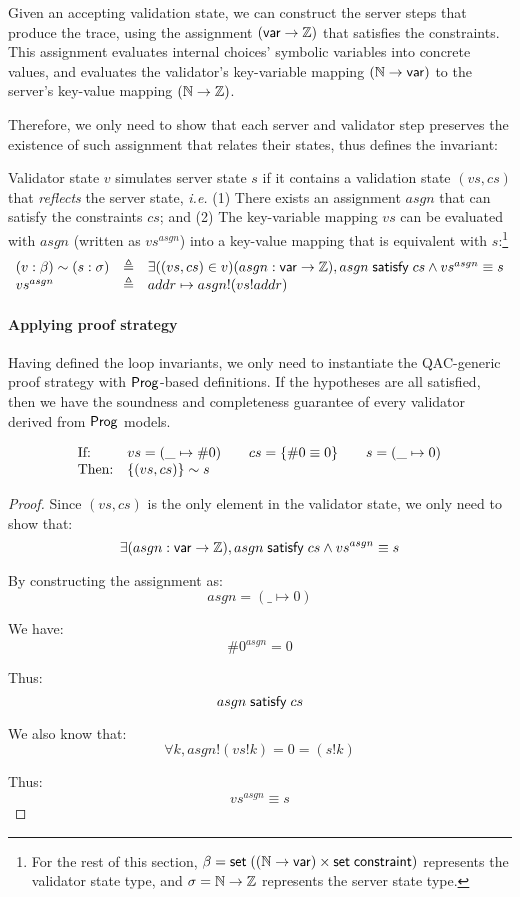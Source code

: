 Given an accepting validation state, we can construct the server steps that
produce the trace, using the assignment $(\mathsf{var}\to\mathbb Z)$ that satisfies the
constraints.  This assignment evaluates internal choices' symbolic variables
into concrete values, and evaluates the validator's key-variable mapping
$(\mathbb N\to\mathsf{var})$ to the server's key-value mapping $(\mathbb N\to\mathbb Z)$.

Therefore, we only need to show that each server and validator step preserves
the existence of such assignment that relates their states, thus defines the
invariant:

\begin{definition}
  Validator state $v$ simulates server state $s$ if it contains a validation
  state $(vs,cs)$ that {\em reflects} the server state, {\it i.e.}  (1) There
  exists an assignment $asgn$ that can satisfy the constraints $cs$; and (2) The
  key-variable mapping $vs$ can be evaluated with $asgn$ (written as
  $vs^{asgn}$) into a key-value mapping that is equivalent with
  $s$:\footnote{For the rest of this section,
  $\beta=\mathsf{set}\;((\mathbb N\to\mathsf{var})\times\mathsf{set}\;\mathsf{constraint})$ represents the validator
  state type, and $\sigma=\mathbb N\to\mathbb Z$ represents the server state type.}
\[\begin{array}{lll} (v:\beta)\sim (s:\sigma)&\triangleq& \exists((vs,cs)\in
  v)(asgn:\mathsf{var}\to\mathbb Z),asgn\;\mathsf{satisfy}\;cs\wedge vs^{asgn}\equiv s\\
  vs^{asgn}&\triangleq&addr\mapsto asgn!(vs!addr) \end{array}\]
\end{definition}

\paragraph{Applying proof strategy}
Having defined the loop invariants, we only need to instantiate the QAC-generic
proof strategy with $\mathsf{Prog}$-based definitions.  If the hypotheses are all
satisfied, then we have the soundness and completeness guarantee of every
validator derived from $\mathsf{Prog}$ models.

\begin{lemma}[\ref{eq:rs1}]
\[\begin{array}{ll}
\text{If:}&
vs=(\_\mapsto\#0)\qquad
cs=\{\#0\equiv0\}\qquad
s=(\_\mapsto0)\\
\text{Then:}&\{(vs,cs)\}\sim s
\end{array}\]
\end{lemma}
\begin{proof}
Since $(vs,cs)$ is the only element in the validator state, we only need to show
that:
\[\exists(asgn:\mathsf{var}\to\mathbb Z),asgn\;\mathsf{satisfy}\;cs\wedge vs^{asgn}\equiv s\]

By constructing the assignment as: \[asgn=(\_\mapsto0)\]

We have: \[\#0^{asgn}=0\]

Thus: \[asgn\;\mathsf{satisfy}\;cs\]

We also know that: \[\forall k, asgn!(vs!k)=0=(s!k)\]

Thus: \[vs^{asgn}\equiv s\]
\end{proof}

